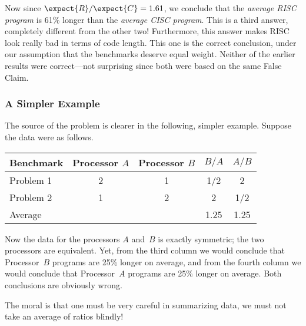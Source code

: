 Now since $\expect{R}/\expect{C} = 1.61$, we conclude that the
\emph{average RISC program} is 61\% longer than the \emph{average CISC
  program}.  This is a third answer, completely different from the
other two!  Furthermore, this answer makes RISC look really bad in
terms of code length.  This one is the correct conclusion, under our
assumption that the benchmarks deserve equal weight.  Neither of the
earlier results were correct---not surprising since both were based on
the same False Claim.


\subsubsection{A Simpler Example}

The source of the problem is clearer in the following, simpler
example.  Suppose the data were as follows.
\begin{center}
\begin{tabular}{lcccc}
Benchmark   & Processor $A$ & Processor $B$ & $B / A$   & $A / B$  \\
\hline
Problem 1   & 2             & 1             & 1/2       & 2 \\
Problem 2   & 1             & 2             & 2         & 1/2 \\
\hline
Average     &               &               & 1.25      & 1.25
\end{tabular}
\end{center}

Now the data for the processors $A$ and~$B$ is exactly symmetric; the
two processors are equivalent.  Yet, from the third column we would
conclude that Processor~$B$ programs are 25\% longer on average, and
from the fourth column we would conclude that Processor~$A$ programs
are 25\% longer on average.  Both conclusions are obviously wrong.

The moral is that one must be very careful in summarizing data, we must
not take an average of ratios blindly!


\begin{problems}
\practiceproblems
{}

\classproblems
{}

\homeworkproblems
{}
\end{problems}

